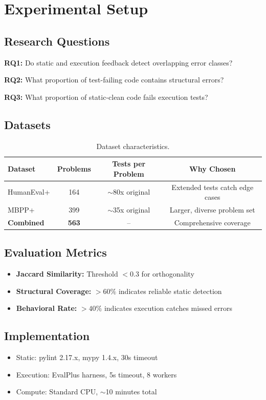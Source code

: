 \section{Experimental Setup}
\label{sec:experiments}

\subsection{Research Questions}

\textbf{RQ1:} Do static and execution feedback detect overlapping error classes?

\textbf{RQ2:} What proportion of test-failing code contains structural errors?

\textbf{RQ3:} What proportion of static-clean code fails execution tests?

\subsection{Datasets}

\begin{table}[h]
\centering
\begin{tabular}{lccc}
\toprule
\textbf{Dataset} & \textbf{Problems} & \textbf{Tests per Problem} & \textbf{Why Chosen} \\
\midrule
HumanEval+ & 164 & $\sim$80x original & Extended tests catch edge cases \\
MBPP+ & 399 & $\sim$35x original & Larger, diverse problem set \\
\textbf{Combined} & \textbf{563} & -- & Comprehensive coverage \\
\bottomrule
\end{tabular}
\caption{Dataset characteristics.}
\label{tab:datasets}
\end{table}

\subsection{Evaluation Metrics}

\begin{itemize}
    \item \textbf{Jaccard Similarity:} Threshold $< 0.3$ for orthogonality
    \item \textbf{Structural Coverage:} $> 60\%$ indicates reliable static detection
    \item \textbf{Behavioral Rate:} $> 40\%$ indicates execution catches missed errors
\end{itemize}

\subsection{Implementation}

\begin{itemize}
    \item Static: pylint 2.17.x, mypy 1.4.x, 30s timeout
    \item Execution: EvalPlus harness, 5s timeout, 8 workers
    \item Compute: Standard CPU, $\sim$10 minutes total
\end{itemize}
